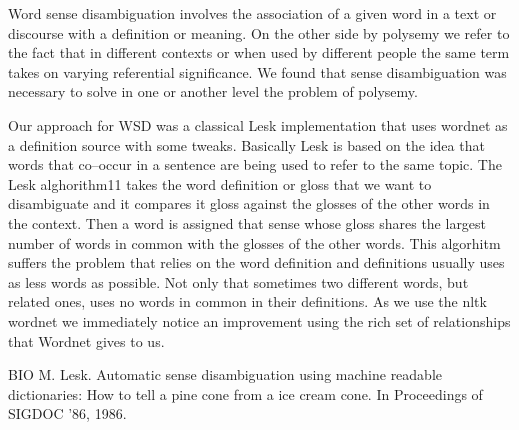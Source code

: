 Word sense disambiguation involves the association of a given word in a text or discourse with a definition or meaning.
On the other side by polysemy we refer to the fact that in different contexts or when used by different people the same term takes on varying referential significance.
We found that sense disambiguation was necessary to solve in one or another level the problem of polysemy.


Our approach for WSD was a classical Lesk implementation that uses wordnet as a definition source with some tweaks.
Basically Lesk is based on the idea that words that co–occur in a sentence are being used to refer to the same topic.
The Lesk alghorithm{11} takes the word definition or gloss that we want to disambiguate and it compares it gloss against the glosses of the other words in the context.
Then a word is assigned that sense whose gloss shares the largest number of words in common with the glosses of the other words.
This algorhitm suffers the problem that relies on the word definition and definitions usually uses as less words as possible.
Not only that sometimes two different words, but related ones, uses no words in common in their definitions.
As we use the nltk wordnet we immediately notice an improvement using the rich set of relationships that Wordnet gives to us.



BIO
M. Lesk. Automatic sense disambiguation using machine readable dictionaries: How to tell a pine cone from a ice cream cone. In Proceedings of SIGDOC ’86, 1986.
